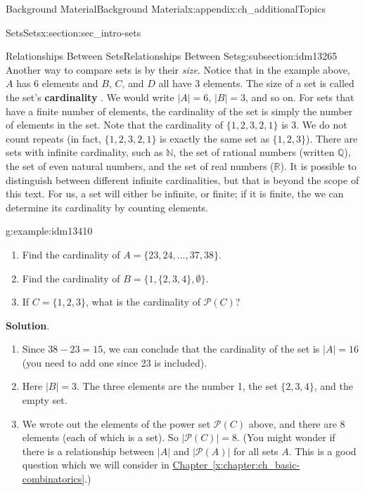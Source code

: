 \documentclass[oneside,10pt,]{book}
\newcommand{\terminology}[1]{\textbf{#1}}
\numberwithin{equation}{chapter}
\def\N{\mathbb N}
\def\pow{\mathcal P}
\newcommand{\card}[1]{\left| #1 \right|}
\begin{document}
\begin{appendixptx}{Background Material}{}{Background Material}{}{}{x:appendix:ch_additionalTopics}
\begin{sectionptx}{Sets}{}{Sets}{}{}{x:section:sec_intro-sets}
\begin{subsectionptx}{Relationships Between Sets}{}{Relationships Between Sets}{}{}{g:subsection:idm13265}
Another way to compare sets is by their \emph{size}. Notice that in the example above, \(A\) has 6 elements and \(B\), \(C\), and \(D\) all have 3 elements. The size of a set is called the set's \terminology{cardinality} . We would write \(|A| = 6\), \(|B| = 3\), and so on. For sets that have a finite number of elements, the cardinality of the set is simply the number of elements in the set. Note that the cardinality of \(\{ 1, 2, 3, 2, 1\}\) is 3. We do not count repeats (in fact, \(\{1, 2, 3, 2, 1\}\) is exactly the same set as \(\{1, 2, 3\}\)). There are sets with infinite cardinality, such as \(\N\), the set of rational numbers (written \(\mathbb Q\)), the set of even natural numbers, and the set of real numbers (\(\mathbb R\)). It is possible to distinguish between different infinite cardinalities, but that is beyond the scope of this text. For us, a set will either be infinite, or finite; if it is finite, the we can determine its cardinality by counting elements.%
\begin{example}{}{g:example:idm13410}%
%
\begin{enumerate}
\item{}Find the cardinality of \(A = \{23, 24, \ldots, 37, 38\}\).%
\item{}Find the cardinality of \(B = \{1, \{2, 3, 4\}, \emptyset\}\).%
\item{}If \(C = \{1,2,3\}\), what is the cardinality of \(\pow(C)\)?%
\end{enumerate}
%
\par\smallskip%
\noindent\textbf{Solution}.\hypertarget{g:solution:idm13424}{}\quad{}%
\begin{enumerate}
\item{}Since \(38 - 23 = 15\), we can conclude that the cardinality of the set is \(|A| = 16\) (you need to add one since 23 is included).%
\item{}Here \(|B| = 3\). The three elements are the number 1, the set \(\{2,3,4\}\), and the empty set.%
\item{}We wrote out the elements of the power set \(\pow(C)\) above, and there are 8 elements (each of which is a set). So \(\card{\pow(C)} = 8\).  (You might wonder if there is a relationship between \(\card{A}\) and \(\card{\pow(A)}\) for all sets \(A\).  This is a good question which we will consider in \hyperref[x:chapter:ch_basic-combinatorics]{Chapter~\ref{x:chapter:ch_basic-combinatorics}}.)%
\end{enumerate}
%
\end{example}
\end{subsectionptx}

\end{sectionptx}
\end{appendixptx}
\end{document}
